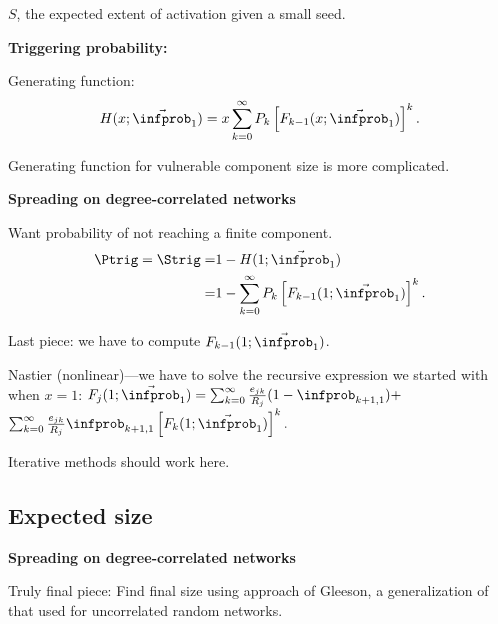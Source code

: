      $S$, the expected extent of activation given
      a small seed.
    

    \textbf{Triggering probability:}
      
       
        Generating function:
        $$
        H(x;\vec{\infprob}_1)
        = 
        x
        \sum_{k=0}^\infty
        P_k
        \left[
          F_{k-1}(x;\vec{\infprob}_1)
        \right]^k.
        $$
      
        Generating function for vulnerable
        component size is more complicated.
      
    
    
  


  \textbf{Spreading on degree-correlated networks}


  
   
    Want probability of \alert{not reaching} a finite component.
    \begin{align}
      \nonumber
      \Ptrig  = \Strig 
      = & 
      1 -
      H(1;\vec{\infprob}_1) 
      \\
      \nonumber
      = &
      1
      -
      \sum_{k=0}^\infty
      P_k
      \left[
        F_{k-1}(1;\vec{\infprob}_1)
      \right]^k.
    \end{align}
  
    Last piece: we have to compute $F_{k-1}(1;\vec{\infprob}_1)$.
  
    Nastier (nonlinear)---we have to solve the 
    recursive expression we started with when $x=1$:
    $
      F_j(1;\vec{\infprob}_1)
      =
      \sum_{k=0}^{\infty} 
      \frac{e_{jk}}{R_j}
      ( 1 - \infprob_{k+1,1} )
      + $\\
      \mbox{} \hfill
      $
      \sum_{k=0}^{\infty} 
      \frac{e_{jk}}{R_j}
      \infprob_{k+1,1}
      \left[
        F_k(1;\vec{\infprob}_1)
      \right]^k.
    $
  
    Iterative methods should work here.
  


\subsection{Expected size}

  \textbf{Spreading on degree-correlated networks}

  
  
    \alert{Truly final piece:} 
    Find final size using approach of Gleeson\cite{gleeson2008a},
    a generalization of that used for uncorrelated random networks.
  

